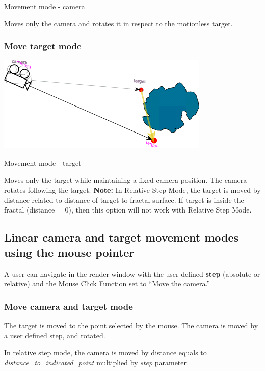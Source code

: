 Movement mode - camera

Moves only the camera and rotates it in respect to the motionless
target.

\subsubsection{Move target mode}\label{move-target-mode}

\includegraphics[width=3.98819in,height=1.80208in]{img/manual/media/image13.png}

Movement mode - target

Moves only the target while maintaining a fixed camera position. The
camera rotates following the target. \textbf{Note:} In Relative Step
Mode, the target is moved by distance related to distance of target to
fractal surface. If target is inside the fractal (distance = 0), then
this option will not work with Relative Step Mode.

\subsection{Linear camera and target movement modes using the mouse
pointer}\label{linear-camera-and-target-movement-modes-using-the-mouse-pointer}

A user can navigate in the render window with the user-defined
\textbf{step} (absolute or relative) and the Mouse Click Function set to
``Move the camera.''

\subsubsection{Move camera and target
mode}\label{move-camera-and-target-mode-1}

The target is moved to the point selected by the mouse. The camera is
moved by a user defined step, and rotated.

In relative step mode, the camera is moved by distance equals to
\emph{distance\_to\_indicated\_point} multiplied by \emph{step}
parameter\emph{.}

